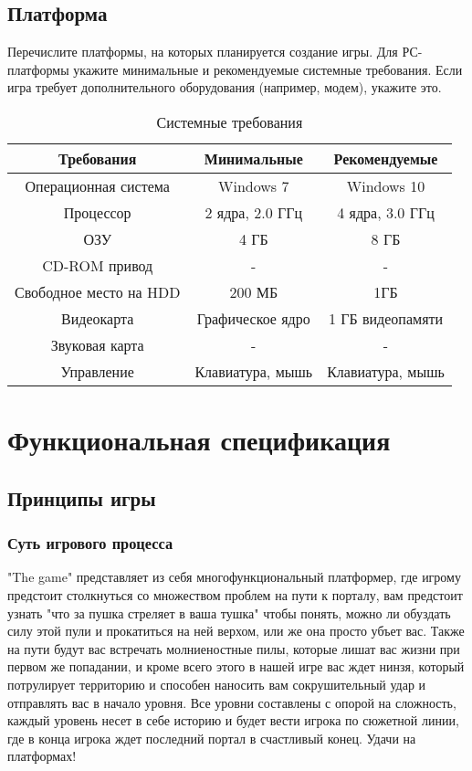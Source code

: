 \documentclass[a4paper,12pt]{article}
\begin{document}
\subsection{Платформа}
Перечислите платформы, на которых планируется создание игры. Для РС-платформы укажите минимальные и рекомендуемые системные требования. Если игра требует дополнительного оборудования (например, модем), укажите это.  
\begin{table}[h!]
\centering
\begin{tabular}{|c|c|c|}
\hline

Требования & \textbf{Минимальные} & \textbf{Рекомендуемые} \\ \hline
Операционная система & Windows 7 & Windows 10\\ \hline
Процессор& 2 ядра, 2.0 ГГц & 4 ядра, 3.0 ГГц\\ \hline
ОЗУ& 4 ГБ& 8 ГБ\\ \hline
CD-ROM привод & - & - \\ \hline
Свободное место на HDD&200 МБ & 1ГБ\\ \hline
Видеокарта & Графическое ядро & 1 ГБ видеопамяти \\ \hline
Звуковая карта& - & - \\ \hline
Управление& Клавиатура, мышь & Клавиатура, мышь\\ \hline
\end{tabular}

\caption{Системные требования}
\label{tab:example_table}
\end{table}


\section{Функциональная спецификация}


\subsection{Принципы игры}


\subsubsection{Суть игрового процесса}
"The game" представляет из себя многофункциональный платформер, где игрому предстоит столкнуться со множеством проблем на пути к порталу, вам предстоит узнать "что за пушка стреляет в ваша тушка" чтобы понять, можно ли обуздать силу этой пули и прокатиться на ней верхом, или же она просто убъет вас. Также на пути будут вас встречать молниеностные пилы, которые лишат вас жизни при первом же попадании, и кроме всего этого в нашей игре вас ждет нинзя, который потрулирует территорию и способен наносить вам сокрушительный удар и отправлять вас в начало уровня. Все уровни составлены с опорой на сложность, каждый уровень несет в себе историю и будет вести игрока по сюжетной линии, где в конца игрока ждет последний портал в счастливый конец. Удачи на платформах!
\end{document}
